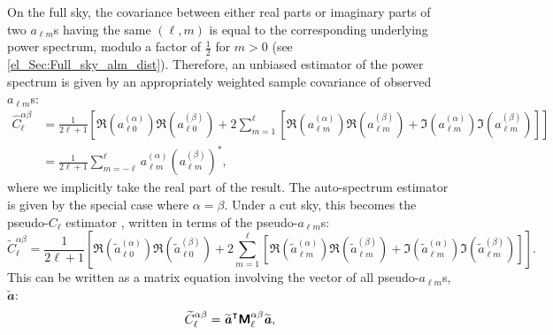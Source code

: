 On the full sky, the covariance between either real parts or imaginary parts of two $a_{\ell m}$s having the same $(\ell, m)$ is equal to the corresponding underlying power spectrum, modulo a factor of $\frac{1}{2}$ for $m > 0$ (see \autoref{el_Sec:Full_sky_alm_dist}). Therefore, an unbiased estimator of the power spectrum is given by an appropriately weighted sample covariance of observed $a_{\ell m}$s:
\begin{equation}
\begin{split}
\widehat{C}_\ell^{\alpha \beta}
&= \frac{1}{2 \ell + 1} \left[
\Re \left( a_{\ell 0}^{\left( \alpha \right)} \right)
\Re \left( a_{\ell 0}^{\left( \beta \right)} \right)
+ 2 \sum_{m = 1}^{\ell} \left[
\Re \left( a_{\ell m}^{\left( \alpha \right)} \right)
\Re \left( a_{\ell m}^{\left( \beta \right)} \right)
+ \Im \left( a_{\ell m}^{\left( \alpha \right)} \right)
\Im \left( a_{\ell m}^{\left( \beta \right)} \right)
\right] \right] \\
&= \frac{1}{2 \ell + 1} \sum_{m = -\ell}^{\ell}
a_{\ell m}^{\left( \alpha \right)}
\left( a_{\ell m}^{\left( \beta \right)} \right)^*,
\end{split}
\end{equation}
where we implicitly take the real part of the result. The auto-spectrum estimator is given by the special case where $\alpha = \beta$. Under a cut sky, this becomes the pseudo-$C_\ell$ estimator \citep{Wandelt2001, Hivon2002, Brown2005}, written in terms of the pseudo-$a_{\ell m}$s:
\begin{equation}
    \widetilde{C}_\ell^{\alpha \beta} = \frac{1}{2 \ell + 1} \left[
    \Re \left( \widetilde{a}_{\ell 0}^{\left( \alpha \right)} \right)
    \Re \left( \widetilde{a}_{\ell 0}^{\left( \beta \right)} \right)
    + 2 \sum_{m = 1}^{\ell} \left[
    \Re \left( \widetilde{a}_{\ell m}^{\left( \alpha \right)} \right)
    \Re \left( \widetilde{a}_{\ell m}^{\left( \beta \right)} \right)
    + \Im \left( \widetilde{a}_{\ell m}^{\left( \alpha \right)} \right)
    \Im \left( \widetilde{a}_{\ell m}^{\left( \beta \right)} \right)
    \right] \right].
    \label{el_Eqn:pcl_estimator_full}
\end{equation}
This can be written as a matrix equation involving the vector of all pseudo-$a_{\ell m}$s, $\widetilde{\mathbfit{a}}$:
\begin{equation}
    \widetilde{C}_\ell^{\alpha \beta} =
    \widetilde{\bm{\mathit{a}}}^\intercal \bm{\mathsf{M}}_\ell^{\alpha \beta}
    \widetilde{\bm{\mathit{a}}},
    \label{el_Eqn:estimator_as_qf}
\end{equation}
